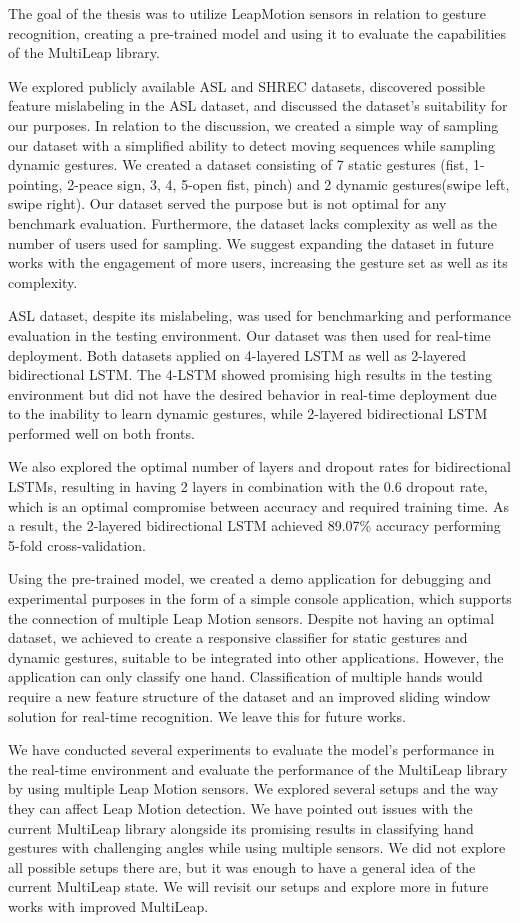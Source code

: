 The goal of the thesis was to utilize LeapMotion sensors in relation to gesture recognition, creating a pre-trained model and using it to evaluate the capabilities of the MultiLeap library.

We explored publicly available ASL and SHREC datasets, discovered possible feature mislabeling in the ASL dataset, and discussed the dataset's suitability for our purposes. In relation to the discussion, we created a simple way of sampling our dataset with a simplified ability to detect moving sequences while sampling dynamic gestures. We created a dataset consisting of 7 static gestures (fist, 1-pointing, 2-peace sign, 3, 4, 5-open fist, pinch) and 2 dynamic gestures(swipe left, swipe right). Our dataset served the purpose but is not optimal for any benchmark evaluation. Furthermore, the dataset lacks complexity as well as the number of users used for sampling. We suggest expanding the dataset in future works with the engagement of more users, increasing the gesture set as well as its complexity.

ASL dataset, despite its mislabeling, was used for benchmarking and performance evaluation in the testing environment. Our dataset was then used for real-time deployment. Both datasets applied on 4-layered LSTM as well as 2-layered bidirectional LSTM. The 4-LSTM showed promising high results in the testing environment but did not have the desired behavior in real-time deployment due to the inability to learn dynamic gestures, while 2-layered bidirectional LSTM performed well on both fronts. 

We also explored the optimal number of layers and dropout rates for bidirectional LSTMs, resulting in having 2 layers in combination with the 0.6 dropout rate, which is an optimal compromise between accuracy and required training time. As a result, the 2-layered bidirectional LSTM achieved 89.07\% accuracy performing 5-fold cross-validation.

Using the pre-trained model, we created a demo application for debugging and experimental purposes in the form of a simple console application, which supports the connection of multiple Leap Motion sensors. Despite not having an optimal dataset, we achieved to create a responsive classifier for static gestures and dynamic gestures, suitable to be integrated into other applications. However, the application can only classify one hand. Classification of multiple hands would require a new feature structure of the dataset and an improved sliding window solution for real-time recognition. We leave this for future works.

We have conducted several experiments to evaluate the model's performance in the real-time environment and evaluate the performance of the MultiLeap library by using multiple Leap Motion sensors. We explored several setups and the way they can affect Leap Motion detection. We have pointed out issues with the current MultiLeap library alongside its promising results in classifying hand gestures with challenging angles while using multiple sensors. We did not explore all possible setups there are, but it was enough to have a general idea of the current MultiLeap state. We will revisit our setups and explore more in future works with improved MultiLeap.

